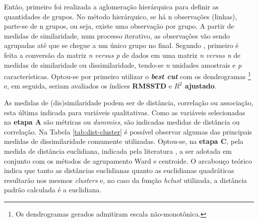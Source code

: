 Então, primeiro foi realizada a aglomeração hierárquica para definir as quantidades de grupos.
No método hierárquico, se há n observações (linhas), parte-se de n grupos, ou seja, existe uma observação por grupo. 
A partir de medidas de similaridade, num processo iterativo, as observações vão sendo agrupadas até que se chegue a um único grupo no final. 
Segundo , primeiro é feita a conversão da matriz \textit{n versus p} de dados em uma matriz \textit{n versus n} de medidas de similaridade ou dissimilaridade, tendo-se \textit{n} unidades amostrais e \textit{p} características.
Optou-se por primeiro utilizar o \textbf{\textit{best cut}} com os dendrogramas%
\footnote{Os dendrogramas gerados admitiram escala não-monotônica.} 
e, em seguida, seriam avaliados os índices \textbf{RMSSTD} e \textbf{$R^2$ ajustado}.

As medidas de (dis)similaridade podem ser de distância, correlação ou associação, esta última indicada para variáveis qualitativas. Como as variáveis selecionadas na \textbf{etapa A} são métricas ou \textit{dummies}, são indicadas medidas de distância ou correlação. 
Na Tabela \ref{tab:dist-cluster} é possível observar algumas das principais medidas de dissimilaridade comumente utilizadas.
Optou-se, na \textbf{etapa C}, pela medida de distância euclidiana, indicada pela literatura , 
a ser adotada em conjunto com os métodos de agrupamento Ward \cite{WARD1963} e centroide. O arcabouço teórico indica que tanto as distâncias euclidianas quanto as euclidianas quadráticas resultarão nos mesmos \textit{clusters} e, no caso da função \textit{hclust} utilizada, a distância padrão calculada é a euclidiana.



